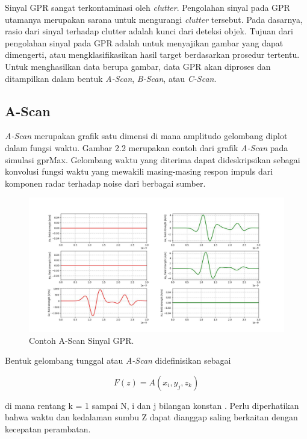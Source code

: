 Sinyal GPR sangat terkontaminasi oleh \emph{clutter}. 
Pengolahan sinyal pada GPR utamanya merupakan sarana untuk mengurangi \emph{clutter} tersebut. 
Pada dasarnya, rasio dari sinyal terhadap clutter adalah kunci dari deteksi objek. 
Tujuan dari pengolahan sinyal pada GPR adalah untuk menyajikan gambar yang dapat dimengerti, atau mengklasifikasikan hasil target berdasarkan prosedur tertentu. 
Untuk menghasilkan data berupa gambar, data GPR akan diproses dan ditampilkan dalam bentuk \emph{A-Scan}, \emph{B-Scan}, atau \emph{C-Scan}. \parencite{3DgprMax}

\subsection{A-Scan}
\label{subsec:aScan}

\emph{A-Scan} merupakan grafik satu dimensi di mana amplitudo gelombang diplot dalam fungsi waktu. 
Gambar 2.2 merupakan contoh dari grafik \emph{A-Scan} pada simulasi gprMax. 
Gelombang waktu yang diterima dapat dideskripsikan sebagai konvolusi fungsi waktu yang mewakili masing-masing respon impuls dari komponen radar terhadap noise dari berbagai sumber. 

\begin{figure}[ht]
  \centering
  \includegraphics[scale=0.35]{gambar/GPRAscan.jpeg}
  \caption{Contoh A-Scan Sinyal GPR.}
  \label{fig:AscanGPR}
\end{figure}

Bentuk gelombang tunggal atau \emph{A-Scan} didefinisikan sebagai

\begin{equation}
  \label{eq:Ascan}
  F(z)=A( x_{i} , y_{j} , z_{k} )
\end{equation}

di mana rentang k = 1 sampai N, i dan j bilangan konstan \parencite{danielDvd}.
Perlu diperhatikan bahwa waktu dan kedalaman sumbu Z dapat dianggap saling berkaitan dengan kecepatan perambatan.


